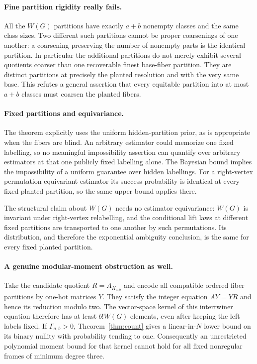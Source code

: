 \documentclass[11pt]{article}
\begin{document}
\paragraph{Fine partition rigidity really fails.}
All the $W(G)$ partitions have exactly $a+b$ nonempty classes and the
same class sizes. Two different such partitions cannot be proper
coarsenings of one another: a coarsening preserving the number of
nonempty parts is the identical partition. In particular the additional
partitions do not merely exhibit several quotients coarser than one
recoverable finest base-fiber partition. They are distinct partitions
at precisely the planted resolution and with the very same base.
This refutes a general assertion that every equitable partition into
at most $a+b$ classes must coarsen the planted fibers.

\paragraph{Fixed partitions and equivariance.}
The theorem explicitly uses the uniform hidden-partition prior, as is
appropriate when the fibers are blind. An arbitrary estimator could
memorize one fixed labelling, so no meaningful impossibility assertion
can quantify over arbitrary estimators at that one publicly fixed
labelling alone. The Bayesian bound implies the impossibility of a
uniform guarantee over hidden labellings. For a right-vertex
permutation-equivariant estimator its success probability is identical
at every fixed planted partition, so the same upper bound applies there.

The structural claim about $W(G)$ needs no estimator equivariance:
$W(G)$ is invariant under right-vertex relabelling, and the conditional
lift laws at different fixed partitions are transported to one another
by such permutations. Its distribution, and therefore the exponential
ambiguity conclusion, is the same for every fixed planted partition.

\paragraph{A genuine modular-moment obstruction as well.}
Take the candidate quotient $R=A_{K_{a,b}}$ and encode all compatible
ordered fiber partitions by one-hot matrices $Y$. They satisfy the
integer equation $AY=YR$ and hence its reduction modulo two.
The vector-space kernel of this intertwiner equation therefore has
at least $b!W(G)$ elements, even after keeping the left labels fixed.
If $\Gamma_{a,b}>0$, Theorem~\ref{thm:count} gives a linear-in-$N$
lower bound on its binary nullity with probability tending to one.
Consequently an unrestricted polynomial moment bound for that kernel
cannot hold for all fixed nonregular frames of minimum degree three.
\end{document}
